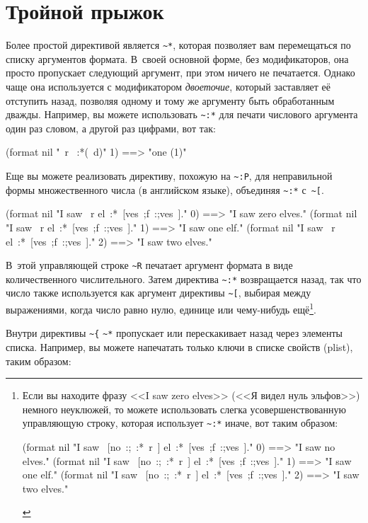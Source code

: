 \section{Тройной прыжок}

Более простой директивой является \lstinline!~*!, которая позволяет вам перемещаться по
списку аргументов формата. В~своей основной форме, без модификаторов, она прос\-то
пропускает следующий аргумент, при этом ничего не печатается. Однако чаще она используется
с модификатором \textit{двоеточие}, который заставляет её отступить назад, позволяя одному
и тому же аргументу быть обработанным дважды. Например, вы можете использовать
\lstinline!~:*! для печати числового аргумента один раз словом, а другой раз цифрами, вот
так:

\begin{myverb}
(format nil "~r ~:*(~d)" 1) ==> "one (1)"
\end{myverb}

Еще вы можете реализовать директиву, похожую на \lstinline!~:P!, для неправильной формы множественного числа (в английском
языке), объединяя \lstinline!~:*! с~\lstinline!~[!.

\begin{myverb}
(format nil "I saw ~r el~:*~[ves~;f~:;ves~]." 0) ==> "I saw zero elves."
(format nil "I saw ~r el~:*~[ves~;f~:;ves~]." 1) ==> "I saw one elf."
(format nil "I saw ~r el~:*~[ves~;f~:;ves~]." 2) ==> "I saw two elves."
\end{myverb}

В~этой управляющей строке \lstinline!~R! печатает аргумент формата в виде количественного числительного. Затем директива
\lstinline!~:*! возвращается назад, так что число также используется как аргумент директивы \lstinline!~[!, выбирая между
выражениями, когда число равно нулю, единице или чему-нибудь ещё\footnote{Если вы находите фразу <<I saw zero elves>>
(<<Я видел нуль эльфов>>) немного неуклюжей, то можете использовать слегка усовершенствованную управляющую строку,
которая использует \lstinline!~:*! иначе, вот таким образом:

\begin{myverb}
(format nil "I saw ~[no~:;~:*~r~] el~:*~[ves~;f~:;ves~]." 0) ==> "I saw no elves."
(format nil "I saw ~[no~:;~:*~r~] el~:*~[ves~;f~:;ves~]." 1) ==> "I saw one elf."
(format nil "I saw ~[no~:;~:*~r~] el~:*~[ves~;f~:;ves~]." 2) ==> "I saw two elves."
\end{myverb}
}.

Внутри директивы \lstinline!~{! \lstinline!~*! пропускает или перескакивает назад через элементы списка. Например, вы можете
напечатать только ключи в списке свойств (plist), таким образом:

